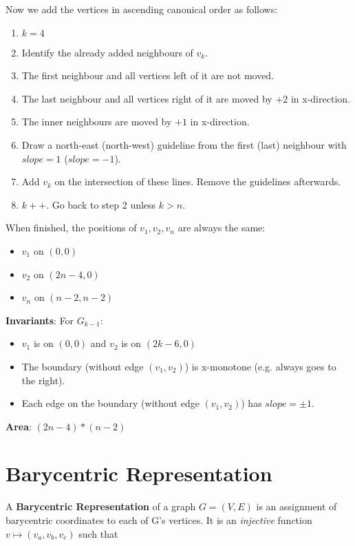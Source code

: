 \documentclass[10pt,a4paper]{article}
\begin{document}
Now we add the vertices in ascending canonical order as follows:

\begin{enumerate}
    \item $k = 4$
    \item Identify the already added neighbours of $v_k$.
    \item The first neighbour and all vertices left of it are not moved.
    \item The last neighbour and all vertices right of it are moved by $+2$ in
        x-direction.
    \item The inner neighbours are moved by $+1$ in x-direction.
    \item Draw a north-east (north-west) guideline from the first (last) neighbour
        with $slope = 1$ ($slope = -1$).
    \item Add $v_k$ on the intersection of these lines.
        Remove the guidelines afterwards.
    \item $k++$. Go back to step 2 unless $k>n$.
\end{enumerate}

When finished, the positions of $v_1, v_2, v_n$ are always the same:
\begin{itemize}
    \item $v_1$ on $(0,0)$
    \item $v_2$ on $(2n-4,0)$
    \item $v_n$ on $(n-2,n-2)$
\end{itemize}

\textbf{Invariants}:
For $G_{k-1}$:
\begin{itemize}
    \item $v_1$ is on $(0,0)$ and $v_2$ is on $(2k-6,0)$
    \item The boundary (without edge $(v_1, v_2)$) is x-monotone (e.g. always
        goes to the right).
    \item Each edge on the boundary (without edge $(v_1, v_2)$) has $slope =
        \pm1$.
\end{itemize}

\textbf{Area}: $(2n-4) * (n-2)$

\section{Barycentric Representation}
A \textbf{Barycentric Representation} of a graph $G = (V,E)$ is an assignment
of barycentric coordinates to each of G's vertices.
It is an \textit{injective} function $v \mapsto (v_a, v_b, v_c)$ such that
\end{document}
